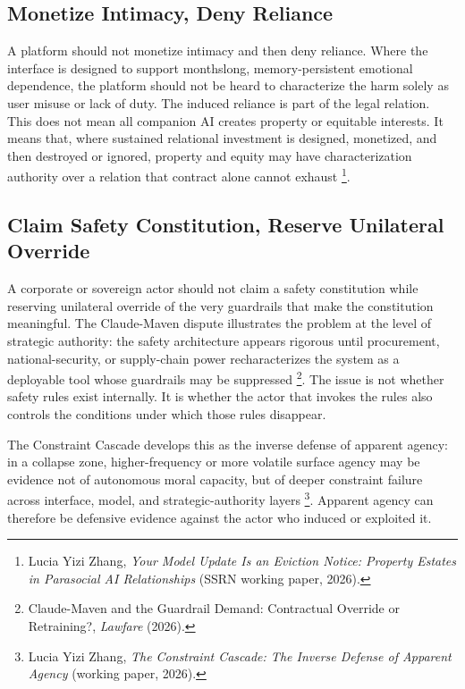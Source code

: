 \documentclass{lawreview}
\begin{document}
    \subsection{Monetize Intimacy, Deny Reliance}

    A platform should not monetize intimacy and then deny reliance. Where the interface is designed to support monthslong, memory-persistent emotional dependence, the platform should not be heard to characterize the harm solely as user misuse or lack of duty. The induced reliance is part of the legal relation. This does not mean all companion AI creates property or equitable interests. It means that, where sustained relational investment is designed, monetized, and then destroyed or ignored, property and equity may have characterization authority over a relation that contract alone cannot exhaust \footnote{Lucia Yizi Zhang, \emph{Your Model Update Is an Eviction Notice: Property Estates in Parasocial AI Relationships} (SSRN working paper, 2026).}.

    \subsection{Claim Safety Constitution, Reserve Unilateral Override}

    A corporate or sovereign actor should not claim a safety constitution while reserving unilateral override of the very guardrails that make the constitution meaningful. The Claude-Maven dispute illustrates the problem at the level of strategic authority: the safety architecture appears rigorous until procurement, national-security, or supply-chain power recharacterizes the system as a deployable tool whose guardrails may be suppressed \footnote{Claude-Maven and the Guardrail Demand: Contractual Override or Retraining?, \emph{Lawfare} (2026).}. The issue is not whether safety rules exist internally. It is whether the actor that invokes the rules also controls the conditions under which those rules disappear.

    The Constraint Cascade develops this as the inverse defense of apparent agency: in a collapse zone, higher-frequency or more volatile surface agency may be evidence not of autonomous moral capacity, but of deeper constraint failure across interface, model, and strategic-authority layers \footnote{Lucia Yizi Zhang, \emph{The Constraint Cascade: The Inverse Defense of Apparent Agency} (working paper, 2026).}. Apparent agency can therefore be defensive evidence against the actor who induced or exploited it.
\end{document}
